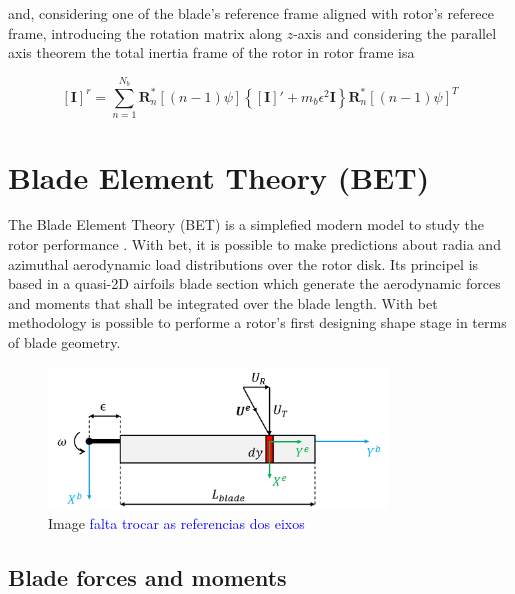 and, considering one of the blade's reference frame aligned with rotor's referece frame, introducing the rotation matrix along $z$-axis and considering the parallel axis theorem the total inertia frame of the rotor in rotor frame isa

\begin{equation}
    \left[\mathbf{I}\right]^r = \sum_{n=1}^{N_b} \boldsymbol{R}_n^*\left[(n-1)\psi\right] \left\{ \left[\mathbf{I}\right]' + m_b \epsilon^2 \boldsymbol{I} \right\} \boldsymbol{R}_n^*\left[(n-1)\psi\right]^T
\end{equation}






\section{Blade Element Theory (BET)}
\label{sec:BET}

The Blade Element Theory (BET) is a simplefied modern model to study the rotor performance \cite{leishman_principles_2006}. With \gls{bet}, it is possible to make predictions about radia and azimuthal aerodynamic load distributions over the rotor disk. Its principel is based in a quasi-2D airfoils blade section which generate the aerodynamic forces and moments that shall be integrated over the blade length. With \gls{bet} methodology is possible to performe a rotor's first designing shape stage in terms of blade geometry.

\begin{figure}[!htb]
    \centering
        \includegraphics[width=9cm]{Figures/implementation/bet/blade_model.png}
        \caption{Image \textcolor{blue}{falta trocar as referencias dos eixos}}
\end{figure}


\subsection{Blade forces and moments}
\label{section:bem_forces_moments}

